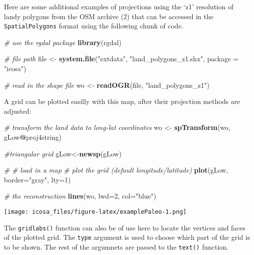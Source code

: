 \documentclass[]{article}
\newenvironment{Shaded}{\begin{snugshade}}{\end{snugshade}}
\newcommand{\KeywordTok}[1]{\textcolor[rgb]{0.13,0.29,0.53}{\textbf{#1}}}
\newcommand{\DataTypeTok}[1]{\textcolor[rgb]{0.13,0.29,0.53}{#1}}
\newcommand{\DecValTok}[1]{\textcolor[rgb]{0.00,0.00,0.81}{#1}}
\newcommand{\StringTok}[1]{\textcolor[rgb]{0.31,0.60,0.02}{#1}}
\newcommand{\CommentTok}[1]{\textcolor[rgb]{0.56,0.35,0.01}{\textit{#1}}}
\newcommand{\OperatorTok}[1]{\textcolor[rgb]{0.81,0.36,0.00}{\textbf{#1}}}
\newcommand{\NormalTok}[1]{#1}
\begin{document}
Here are some additional examples of projections using the `z1'
resolution of landy polygons from the OSM archive (2) that can be
accessed in the \texttt{SpatialPolygons} format using the following
chunk of code.

\begin{Shaded}
\begin{Highlighting}[]
\CommentTok{# use the rgdal package}
\KeywordTok{library}\NormalTok{(rgdal)}

\CommentTok{# file path}
\NormalTok{file <-}\StringTok{ }\KeywordTok{system.file}\NormalTok{(}\StringTok{"extdata"}\NormalTok{, }\StringTok{"land_polygons_z1.shx"}\NormalTok{, }\DataTypeTok{package =} \StringTok{"icosa"}\NormalTok{)}

\CommentTok{# read in the shape file}
\NormalTok{wo <-}\StringTok{ }\KeywordTok{readOGR}\NormalTok{(file, }\StringTok{"land_polygons_z1"}\NormalTok{)}
\end{Highlighting}
\end{Shaded}

A grid can be plotted easilly with this map, after their projection
methods are adjusted:

\begin{Shaded}
\begin{Highlighting}[]
\CommentTok{# transform the land data to long-lat coordinates}
\NormalTok{wo <-}\StringTok{ }\KeywordTok{spTransform}\NormalTok{(wo, gLow}\OperatorTok{@}\NormalTok{proj4string)}

\CommentTok{#triangular grid}
\NormalTok{gLow<-}\KeywordTok{newsp}\NormalTok{(gLow)}

\CommentTok{# # load in a map}
\CommentTok{# plot the grid (default longitude/latitude)}
\KeywordTok{plot}\NormalTok{(gLow, }\DataTypeTok{border=}\StringTok{"gray"}\NormalTok{, }\DataTypeTok{lty=}\DecValTok{1}\NormalTok{)}
 
\CommentTok{# the reconstruction}
\KeywordTok{lines}\NormalTok{(wo, }\DataTypeTok{lwd=}\DecValTok{2}\NormalTok{, }\DataTypeTok{col=}\StringTok{"blue"}\NormalTok{)}
\end{Highlighting}
\end{Shaded}

\texttt{[image: icosa\_files/figure-latex/examplePaleo-1.png]}

The \texttt{gridlabs()} function can also be of use here to locate the
vertices and faces of the plotted grid. The \texttt{type} argument is
used to choose which part of the grid is to be shown. The rest of the
argumnets are passed to the \texttt{text()} function.
\end{document}

